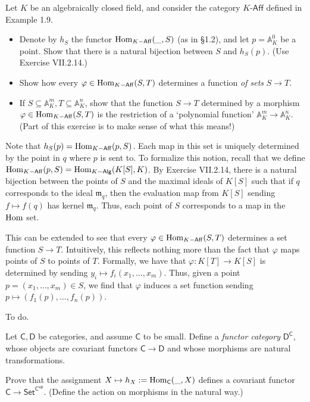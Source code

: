 \documentclass[../../master.tex]{subfiles}
\begin{document}
\begin{problem}
    Let $K$ be an algebraically closed field, and consider the category $K\textsf{-Aff}$ defined in Example 1.9.
    \begin{itemize}
        \item Denote by $h_S$ the functor $\operatorname{Hom}_{K\mathsf{-Aff}}(\_, S)$ (as in \S 1.2), and let $p = \mathbb{A}^{0}_K$ be a point.
            Show that there is a natural bijection between $S$ and $h_S(p)$.
            (Use Exercise VII.2.14.)
        \item Show how every $\varphi \in \operatorname{Hom}_{K\mathsf{-Aff}}(S, T)$ determines a function \textit{of sets} $S \to T$.
        \item If $S \subseteq \mathbb{A}^{m}_K, T \subseteq \mathbb{A}^{n}_K$, show that the function $S \to T$ determined by a morphism $\varphi \in \operatorname{Hom}_{K\mathsf{-Aff}}(S, T)$ is the restriction of a `polynomial function' $\mathbb{A}^{m}_K \to \mathbb{A}^{n}_K$.
            (Part of this exercise is to make sense of what this means!)
    \end{itemize}
\end{problem}

\begin{solution}
    Note that $h_S(p) = \operatorname{Hom}_{K\mathsf{-Aff}}(p, S)$. 
    Each map in this set is uniquely determined by the point in $q$ where $p$ is sent to.
    To formalize this notion, recall that we define $\operatorname{Hom}_{K\mathsf{-Aff}}(p, S) = \operatorname{Hom}_{K\mathsf{-Alg}}(K[S], K)$.
    By Exercise VII.2.14, there is a natural bijection between the points of $S$ and the maximal ideals of $K[S]$ such that if $q$ corresponds to the ideal $\mathfrak{m}_q$, then the evaluation map from $K[S]$ sending $f \mapsto f(q)$ has kernel $\mathfrak{m}_q$.
    Thus, each point of $S$ corresponds to a map in the $\operatorname{Hom}$ set.

    This can be extended to see that every $\varphi \in \operatorname{Hom}_{K\mathsf{-Aff}}(S, T)$ determines a set function $S \to T$.
    Intuitively, this reflects nothing more than the fact that $\varphi$ maps points of $S$ to points of $T$.
    Formally, we have that $\varphi : K[T] \to K[S]$ is determined by sending $y_i \mapsto f_i(x_1, \ldots, x_m)$.
    Thus, given a point $p = (x_1, \ldots, x_m) \in S$, we find that $\varphi$ induces a set function sending $p \mapsto (f_1(p), \ldots, f_n(p))$.

    To do.
\end{solution}

\begin{problem}
    Let $\mathsf{C}, \mathsf{D}$ be categories, and assume $\mathsf{C}$ to be small.
    Define a \textit{functor category} $\mathsf{D^{C}}$, whose objects are covariant functors $\mathsf{C} \to \mathsf{D}$ and whose morphisms are natural transformations.

    Prove that the assignment $X \mapsto h_X := \operatorname{Hom}_{\mathsf{C}}(\_, X)$ defines a covariant functor $\mathsf{C} \to \mathsf{Set}^{\mathsf{C^{\mathsf{op}}}}$.
    (Define the action on morphisms in the natural way.)
\end{problem}
\end{document}
